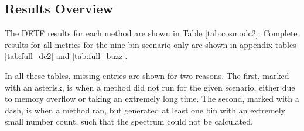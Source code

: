 \documentclass[twocolumn,twocolappendix]{aastex63}
\begin{document}
\subsection{Results Overview}
The DETF results for each method are shown in Table \ref{tab:cosmodc2}.  Complete results for all metrics
for the nine-bin scenario only are shown in appendix tables \ref{tab:full_dc2} and \autoref{tab:full_buzz}.  

In all these tables, missing entries are shown for two reasons.
The first, marked with an asterisk, is when a method did not run for the given scenario,
either due to memory overflow or taking an extremely long time.
The second, marked with a dash, is when a method ran, but generated at least one bin with an extremely 
small number count, such that the spectrum could not be calculated.
\end{document}
